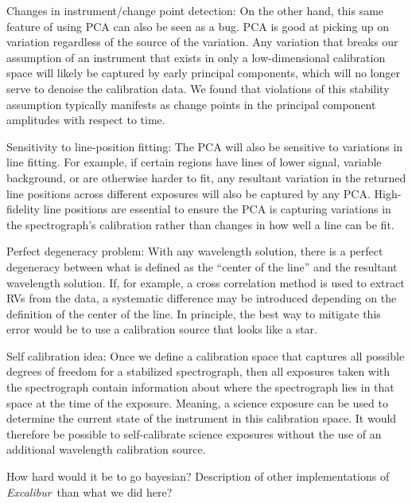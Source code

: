 \documentclass[12pt, letterpaper]{article}
\newcommand{\project}[1]{\textsl{#1}}
\newcommand{\name}{\project{Excalibur}}
\begin{document}
Changes in instrument/change point detection:
On the other hand, this same feature of using PCA can also be seen as a bug.  PCA is good at picking up on variation regardless of the source of the variation.  Any variation that breaks our assumption of an instrument that exists in only a low-dimensional calibration space will likely be captured by early principal components, which will no longer serve to denoise the calibration data.  We found that violations of this stability assumption typically manifests as change points in the principal component amplitudes with respect to time.

Sensitivity to line-position fitting:
The PCA will also be sensitive to variations in line fitting.  For example, if certain regions have lines of lower signal, variable background, or are otherwise harder to fit, any resultant variation in the returned line positions across different exposures will also be captured by any PCA.  High-fidelity line positions are essential to ensure the PCA is capturing variations in the spectrograph's calibration rather than changes in how well a line can be fit.

Perfect degeneracy problem:
With any wavelength solution, there is a perfect degeneracy between what is defined as the ``center of the line'' and the resultant wavelength solution.  If, for example, a cross correlation method is used to extract RVs from the data, a systematic difference may be introduced depending on the definition of the center of the line.  In principle, the best way to mitigate this error would be to use a calibration source that looks like a star.

Self calibration idea:
Once we define a calibration space that captures all possible degrees of freedom for a stabilized spectrograph, then all exposures taken with the spectrograph contain information about where the spectrograph lies in that space at the time of the exposure.  Meaning, a science exposure can be used to determine the current state of the instrument in this calibration space.  It would therefore be possible to self-calibrate science exposures without the use of an additional wavelength calibration source.

How hard would it be to go bayesian?  Description of other implementations of \name\ than what we did here?
\end{document}
